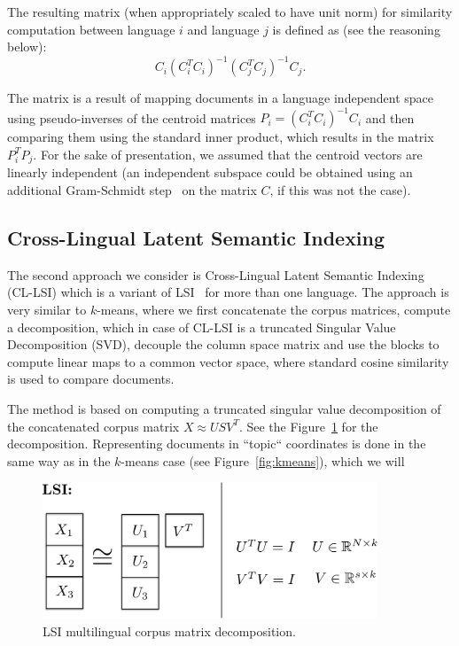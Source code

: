 \documentclass[twoside,11pt]{article}
\begin{document}
The resulting matrix (when appropriately scaled to have unit norm) for similarity computation between language $i$ and language $j$ is defined as (see the reasoning below):
$$C_i(C_i^T C_i)^{-1} (C_j^T C_j)^{-1} C_j.$$

The matrix is a result of mapping documents in a language independent space using pseudo-inverses of the centroid matrices $P_i = (C_i^T C_i)^{-1} C_i$ and then comparing them using the standard inner product, which results in the matrix $P_i^T P_j$. For the sake of presentation, we assumed that the centroid vectors are linearly independent (an independent subspace could be obtained using an additional Gram-Schmidt step~\cite{golub} on the matrix $C$, if this was not the case).

\subsection{Cross-Lingual Latent Semantic Indexing}\label{sec:LSI}

The second approach we consider is Cross-Lingual Latent Semantic Indexing (CL-LSI)\cite{cl_lsi} which is a variant of LSI~ for more than one language. The approach is very similar to $k$-means, where we first concatenate the corpus matrices, compute a decomposition, which in case of CL-LSI is a truncated Singular Value Decomposition (SVD), decouple the
 column space matrix and use the blocks to compute linear maps to a common vector space, where standard cosine similarity is used to compare documents.

 The method is based on computing a truncated singular value decomposition of the concatenated corpus matrix $X \approx U S V^T$. See the Figure~\ref{fig:lsi} for the decomposition. Representing documents in ``topic`` coordinates is done in the same way as in the $k$-means case (see Figure~\ref{fig:kmeans}), which we will

\begin{figure}[tbp]
\centering
\includegraphics[width=10cm]{lsi.pdf}
\caption{\label{fig:lsi} LSI multilingual corpus matrix decomposition.}
\end{figure}
\end{document}
